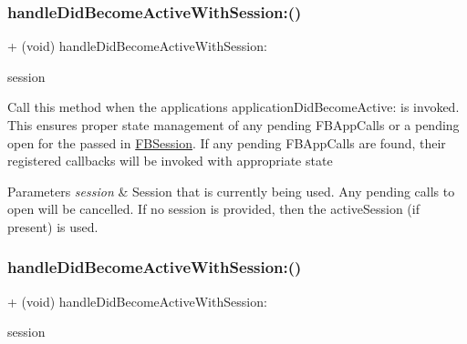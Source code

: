 \subsubsection{\texorpdfstring{handle\+Did\+Become\+Active\+With\+Session\+:()}{handleDidBecomeActiveWithSession:()}\hspace{0.1cm}{\footnotesize\ttfamily [1/5]}}
{\footnotesize\ttfamily + (void) handle\+Did\+Become\+Active\+With\+Session\+: \begin{DoxyParamCaption}\item[{(\hyperlink{interfaceFBSession}{F\+B\+Session} $\ast$)}]{session }\end{DoxyParamCaption}}

Call this method when the application\textquotesingle{}s application\+Did\+Become\+Active\+: is invoked. This ensures proper state management of any pending F\+B\+App\+Calls or a pending open for the passed in \hyperlink{interfaceFBSession}{F\+B\+Session}. If any pending F\+B\+App\+Calls are found, their registered callbacks will be invoked with appropriate state


\begin{DoxyParams}{Parameters}
{\em session} & Session that is currently being used. Any pending calls to open will be cancelled. If no session is provided, then the active\+Session (if present) is used. \\
\hline
\end{DoxyParams}
\mbox{\label{interfaceFBAppCall_aa00467d180eab724577daeeb205524a4}} 
\subsubsection{\texorpdfstring{handle\+Did\+Become\+Active\+With\+Session\+:()}{handleDidBecomeActiveWithSession:()}\hspace{0.1cm}{\footnotesize\ttfamily [2/5]}}
{\footnotesize\ttfamily + (void) handle\+Did\+Become\+Active\+With\+Session\+: \begin{DoxyParamCaption}\item[{(\hyperlink{interfaceFBSession}{F\+B\+Session} $\ast$)}]{session }\end{DoxyParamCaption}}

